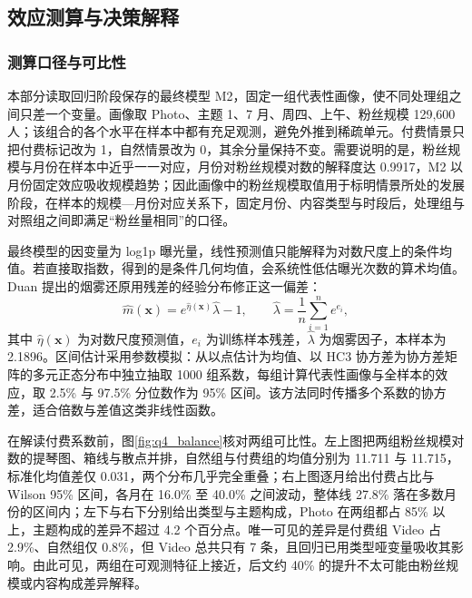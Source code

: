 
\subsection{效应测算与决策解释}

\subsubsection{测算口径与可比性}

本部分读取回归阶段保存的最终模型 M2，固定一组代表性画像，使不同处理组之间只差一个变量。画像取 Photo、主题 1、7 月、周四、上午、粉丝规模 129,600 人；该组合的各个水平在样本中都有充足观测，避免外推到稀疏单元。付费情景只把付费标记改为 1，自然情景改为 0，其余分量保持不变。需要说明的是，粉丝规模与月份在样本中近乎一一对应，月份对粉丝规模对数的解释度达 0.9917，M2 以月份固定效应吸收规模趋势；因此画像中的粉丝规模取值用于标明情景所处的发展阶段，在样本的规模—月份对应关系下，固定月份、内容类型与时段后，处理组与对照组之间即满足“粉丝量相同”的口径。

最终模型的因变量为 log1p 曝光量，线性预测值只能解释为对数尺度上的条件均值。若直接取指数，得到的是条件几何均值，会系统性低估曝光次数的算术均值。Duan 提出的烟雾还原用残差的经验分布修正这一偏差\cite{duan1983}：
\begin{equation}
    \hat m(\boldsymbol{x})=e^{\hat\eta(\boldsymbol{x})}\hat\lambda-1,
    \qquad
    \hat\lambda=\frac{1}{n}\sum_{i=1}^{n}e^{e_i},
\end{equation}
其中 $\hat\eta(\boldsymbol{x})$ 为对数尺度预测值，$e_i$ 为训练样本残差，$\hat\lambda$ 为烟雾因子，本样本为 2.1896。区间估计采用参数模拟：从以点估计为均值、以 HC3 协方差为协方差矩阵的多元正态分布中独立抽取 1000 组系数，每组计算代表性画像与全样本的效应，取 2.5\% 与 97.5\% 分位数作为 95\% 区间。该方法同时传播多个系数的协方差，适合倍数与差值这类非线性函数。

在解读付费系数前，图\ref{fig:q4_balance}核对两组可比性。左上图把两组粉丝规模对数的提琴图、箱线与散点并排，自然组与付费组的均值分别为 11.711 与 11.715，标准化均值差仅 0.031，两个分布几乎完全重叠；右上图逐月给出付费占比与 Wilson 95\% 区间，各月在 16.0\% 至 40.0\% 之间波动，整体线 27.8\% 落在多数月份的区间内；左下与右下分别给出类型与主题构成，Photo 在两组都占 85\% 以上，主题构成的差异不超过 4.2 个百分点。唯一可见的差异是付费组 Video 占 2.9\%、自然组仅 0.8\%，但 Video 总共只有 7 条，且回归已用类型哑变量吸收其影响。由此可见，两组在可观测特征上接近，后文约 40\% 的提升不太可能由粉丝规模或内容构成差异解释。

